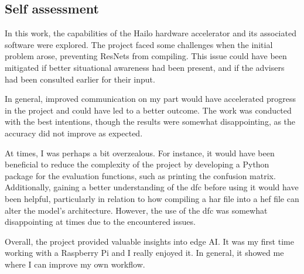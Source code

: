 \subsection*{Self assessment}
In this work, the capabilities of the Hailo hardware accelerator and its associated software were explored.
The project faced some challenges when the initial problem arose, preventing ResNets from compiling.
This issue could have been mitigated if better situational awareness had been present, and if the advisers had been consulted earlier for their input.

In general, improved communication on my part would have accelerated progress in the project and could have led to a better outcome.
The work was conducted with the best intentions, though the results were somewhat disappointing, as the accuracy did not improve as expected.

At times, I was perhaps a bit overzealous.
For instance, it would have been beneficial to reduce the complexity of the project by developing a Python package for the evaluation functions, such as printing the confusion matrix.
Additionally, gaining a better understanding of the \acrshort{dfc} before using it would have been helpful, particularly in relation to how compiling a \acrshort{har} file into a \acrshort{hef} file can alter the model's architecture.
However, the use of the \acrshort{dfc} was somewhat disappointing at times due to the encountered issues.

Overall, the project provided valuable insights into edge AI.
It was my first time working with a Raspberry Pi and I really enjoyed it.
In general, it showed me where I can improve my own workflow.

